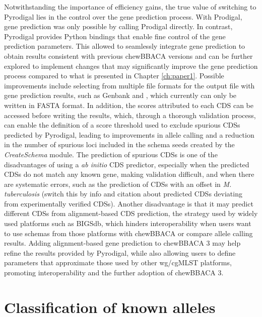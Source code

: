 Notwithstanding the importance of efficiency gains, the true value of switching to Pyrodigal lies in the control over the gene prediction process. With Prodigal, gene prediction was only possible by calling Prodigal directly. In contrast, Pyrodigal provides Python bindings that enable fine control of the gene prediction parameters. This allowed to seamlessly integrate gene prediction to obtain results consistent with previous chewBBACA versions and can be further explored to implement changes that may significantly improve the gene prediction process compared to what is presented in Chapter \ref{ch:paper1}. Possible improvements include selecting from multiple file formats for the output file with gene prediction results, such as Genbank and , which currently can only be written in FASTA format. In addition, the scores attributed to each \ac{CDS} can be accessed before writing the results, which, through a thorough validation process, can enable the definition of a score threshold used to exclude spurious \ac{CDSs} predicted by Pyrodigal, leading to improvements in allele calling and a reduction in the number of spurious loci included in the schema seeds created by the \textit{CreateSchema} module. The prediction of spurious \ac{CDSs} is one of the disadvantages of using a \textit{ab initio} CDS predictor, especially when the predicted CDSs do not match any known gene, making validation difficult, and when there are systematic errors, such as the prediction of CDSs with an offset in \textit{M. tuberculosis} (switch this by info and citation about predicted CDSs deviating from experimentally verified CDSs). Another disadvantage is that it may predict different \ac{CDSs} from alignment-based CDS prediction, the strategy used by widely used platforms such as BIGSdb, which hinders interoperability when users want to use schemas from those platforms with chewBBACA or compare allele calling results. Adding alignment-based gene prediction to chewBBACA 3 may help refine the results provided by Pyrodigal, while also allowing users to define parameters that approximate those used by other wg/cgMLST platforms, promoting interoperability and the further adoption of chewBBACA 3.

\section{Classification of known alleles}

